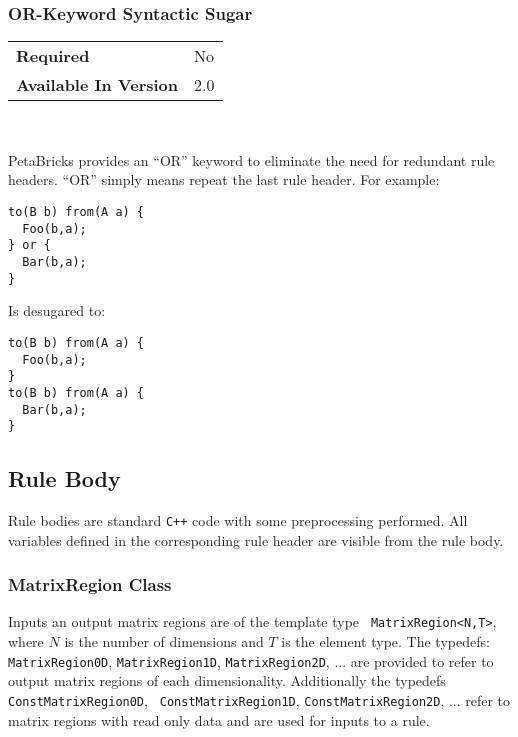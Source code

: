 \documentclass[11pt]{article}
\begin{document}
\subsubsection{OR-Keyword Syntactic Sugar}

\begin{tabular}{| l | l |}
\hline
\bf Required & No \\
\bf Available In Version & 2.0        \\
\hline
\end{tabular}

~

PetaBricks provides an ``OR'' keyword to eliminate the need for redundant 
rule headers.  ``OR'' simply means repeat the last rule header. For example:
 
\begin{minipage}{\linewidth}
\begin{lstlisting}
to(B b) from(A a) {
  Foo(b,a);
} or {
  Bar(b,a);
}
\end{lstlisting}
\end{minipage}
Is desugared to:

\begin{minipage}{\linewidth}
\begin{lstlisting}
to(B b) from(A a) {
  Foo(b,a);
}
to(B b) from(A a) {
  Bar(b,a);
}
\end{lstlisting}
\end{minipage}

\subsection{Rule Body}
\label{sec:body}

Rule bodies are standard {\tt C++} code with some preprocessing performed.
All variables defined in the corresponding rule header are visible from the 
rule body.

\subsubsection{MatrixRegion Class}
Inputs an output matrix regions are of the template type {\tt
MatrixRegion<N,T>}, where $N$ is the number of dimensions and $T$ is the
element type.  The typedefs: {\tt MatrixRegion0D}, {\tt MatrixRegion1D},
{\tt MatrixRegion2D}, ... are provided to refer to output matrix regions of each
dimensionality.  Additionally the typedefs {\tt ConstMatrixRegion0D}, {\tt
ConstMatrixRegion1D}, {\tt ConstMatrixRegion2D}, ... refer to matrix
regions with read only data and are used for inputs to a rule.
\end{document}
